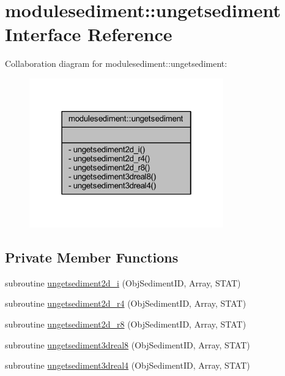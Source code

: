 \hypertarget{interfacemodulesediment_1_1ungetsediment}{}\section{modulesediment\+:\+:ungetsediment Interface Reference}
\label{interfacemodulesediment_1_1ungetsediment}


Collaboration diagram for modulesediment\+:\+:ungetsediment\+:\nopagebreak
\begin{figure}[H]
\begin{center}
\leavevmode
\includegraphics[width=238pt]{interfacemodulesediment_1_1ungetsediment__coll__graph}
\end{center}
\end{figure}
\subsection*{Private Member Functions}
\begin{DoxyCompactItemize}
\item 
subroutine \mbox{\hyperlink{interfacemodulesediment_1_1ungetsediment_a04acf8ef87a03c303770a48021c0a2d7}{ungetsediment2d\+\_\+i}} (Obj\+Sediment\+ID, Array, S\+T\+AT)
\item 
subroutine \mbox{\hyperlink{interfacemodulesediment_1_1ungetsediment_a00c6698e7f14a43dfe57336b399972cf}{ungetsediment2d\+\_\+r4}} (Obj\+Sediment\+ID, Array, S\+T\+AT)
\item 
subroutine \mbox{\hyperlink{interfacemodulesediment_1_1ungetsediment_a9a52192f089bf964618930b434993890}{ungetsediment2d\+\_\+r8}} (Obj\+Sediment\+ID, Array, S\+T\+AT)
\item 
subroutine \mbox{\hyperlink{interfacemodulesediment_1_1ungetsediment_a34f0df69fba945d79bb4457ba1a346f3}{ungetsediment3dreal8}} (Obj\+Sediment\+ID, Array, S\+T\+AT)
\item 
subroutine \mbox{\hyperlink{interfacemodulesediment_1_1ungetsediment_a4d0d7a53cb78bde21bf05feb123612c8}{ungetsediment3dreal4}} (Obj\+Sediment\+ID, Array, S\+T\+AT)
\end{DoxyCompactItemize}


